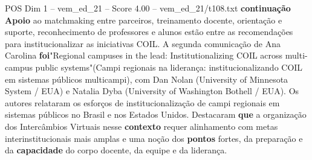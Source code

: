 \begin{textsample}{POS Dim 1 – vem\_ed\_21 – Score 4.00 – vem\_ed\_21/t108.txt}  \label{ex:f1_pos_170}
\textbf{continuação} \textbf{Apoio} ao matchmaking entre parceiros, treinamento docente, orientação e suporte, reconhecimento de professores e alunos estão entre as recomendações para institucionalizar as iniciativas COIL.
A segunda comunicação de Ana Carolina \textbf{foi}"Regional campuses in the lead: Institutionalizing COIL across multi-campus public systems"(Campi regionais na liderança: institucionalizando COIL em sistemas públicos multicampi), com Dan Nolan (University of Minnesota System / EUA) e Natalia Dyba (University of Washington Bothell / EUA).
Os autores relataram os esforços de institucionalização de campi regionais em sistemas públicos no Brasil e nos Estados Unidos.
Destacaram \textbf{que} a organização dos Intercâmbios Virtuais nesse \textbf{contexto} requer alinhamento com metas interinstitucionais mais amplas e uma noção dos \textbf{pontos} fortes, da preparação e da \textbf{capacidade} do corpo docente, da equipe e da liderança.

\end{textsample}
